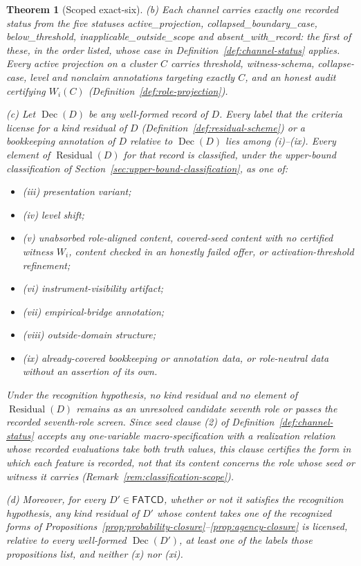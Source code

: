 \documentclass[11pt]{article}
\newtheorem{theorem}{Theorem}[section]
\theoremstyle{definition}
\newcommand{\FATCD}{\ensuremath{\mathsf{FATCD}}}
\newcommand{\Dec}[1]{\ensuremath{\operatorname{Dec}\!\left(#1\right)}}
\newcommand{\Residual}[1]{\ensuremath{\operatorname{Residual}\!\left(#1\right)}}
\newcommand{\activeproj}{\textit{active\_\allowbreak projection}}
\newcommand{\belowthr}{\textit{below\_\allowbreak threshold}}
\newcommand{\collapsedbc}{\textit{collapsed\_\allowbreak boundary\_\allowbreak case}}
\newcommand{\absentrec}{\textit{absent\_\allowbreak with\_\allowbreak record}}
\newcommand{\outsidescope}{\textit{inapplicable\_\allowbreak outside\_\allowbreak scope}}
\begin{document}
\begin{theorem}[Scoped exact-six]
\par\noindent\textup{(b)} Each channel carries exactly one recorded status from the five statuses \activeproj{}, \collapsedbc{}, \belowthr{},
\outsidescope{} and \absentrec{}: the first of these, in the order listed, whose case in
Definition~\ref{def:channel-status} applies. Every active projection on a cluster \(C\) carries
threshold, witness-schema, collapse-case, level and nonclaim annotations
targeting exactly \(C\), and an honest audit certifying \(W_i(C)\)
(Definition~\ref{def:role-projection}).
\par\noindent\textup{(c)} Let \(\Dec{D}\) be any well-formed record of \(D\). Every label that the criteria license for a kind residual of \(D\)
(Definition~\ref{def:residual-scheme}) or a bookkeeping annotation of \(D\) relative to \(\Dec{D}\) lies among
(i)--(ix). Every element of \(\Residual{D}\) for that record is
classified, under the upper-bound classification of
Section~\ref{sec:upper-bound-classification}, as one of:
\begin{itemize}[topsep=2pt,itemsep=1pt]
  \item (iii) presentation variant;
  \item (iv) level shift;
  \item (v) unabsorbed role-aligned content, covered-seed content with no
    certified witness \(W_i\), content checked in an honestly failed offer, or activation-threshold refinement;
  \item (vi) instrument-visibility artifact;
  \item (vii) empirical-bridge annotation;
  \item (viii) outside-domain structure;
  \item (ix) already-covered bookkeeping or annotation data, or role-neutral data
    without an assertion of its own.
\end{itemize}
Under the recognition hypothesis, no kind residual and no element of \(\Residual{D}\) remains as an unresolved candidate
seventh role or passes the recorded seventh-role screen. Since seed clause (2)
of Definition~\ref{def:channel-status} accepts any one-variable macro-specification with a realization relation
whose recorded evaluations take both truth values, this clause certifies the
form in which each feature is recorded, not that its content concerns the role
whose seed or witness it carries (Remark~\ref{rem:classification-scope}).
\par\noindent\textup{(d)} Moreover, for
every \(D'\in\FATCD{}\), whether or not it satisfies the recognition
hypothesis, any kind residual of \(D'\)
whose content takes one of the recognized forms of
Propositions~\ref{prop:probability-closure}--\ref{prop:agency-closure}
is licensed, relative to every well-formed \(\Dec{D'}\), at least one of the
labels those propositions list, and neither (x) nor (xi).


\end{theorem}
\end{document}
